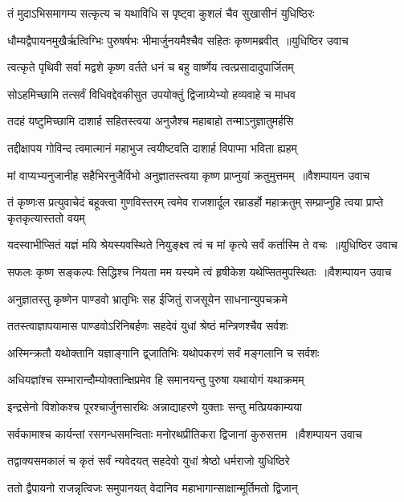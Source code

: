 \twolineshloka
{तं मुदाऽभिसमागम्य सत्कृत्य च यथाविधि}
{स पृष्ट्वा कुशलं चैव सुखासीनं युधिष्ठिरः}


\twolineshloka
{धौम्यद्वैपायनमुखैर्ऋत्विग्भिः पुरुषर्षभः}
{भीमार्जुनयमैश्चैव सहितः कृष्णमब्रवीत् ॥युधिष्ठिर उवाच}


\twolineshloka
{त्वत्कृते पृथिवी सर्वा मद्वशे कृष्ण वर्तते}
{धनं च बहु वार्ष्णेय त्वत्प्रसादादुपार्जितम्}


\twolineshloka
{सोऽहमिच्छामि तत्सर्वं विधिवद्देवकीसुत}
{उपयोक्तुं द्विजाग्र्येभ्यो हव्यवाहे च माधव}


\twolineshloka
{तदहं यष्टुमिच्छामि दाशार्ह सहितस्त्वया}
{अनुजैश्च महाबाहो तन्माऽनुज्ञातुमर्हसि}


\twolineshloka
{तद्दीक्षापय गोविन्द त्वमात्मानं महाभुज}
{त्वयीष्टवति दाशार्ह विपाप्मा भविता ह्यहम्}


\threelineshloka
{मां वाप्यभ्यनुजानीह सहैभिरनुजैर्विभो}
{अनुज्ञातस्त्वया कृष्ण प्राप्नुयां क्रतुमुत्तमम् ॥वैशम्पायन उवाच}
{}


\threelineshloka
{तं कृष्णःस प्रत्युवाचेदं बहूक्त्वा गुणविस्तरम्}
{त्वमेव राजशार्दूल रम्राडर्हो महाक्रतुम्}
{सम्प्राप्नुहि त्वया प्राप्ते कृतकृत्यास्ततो वयम्}


\threelineshloka
{यदस्वाभीप्सितं यज्ञं मयि श्रेयस्यवस्थिते}
{नियुङ्क्ष्व त्वं च मां कृत्ये सर्वं कर्तास्मि ते वचः ॥युधिष्ठिर उवाच}
{}


\threelineshloka
{सफलः कृष्ण सङ्कल्पः सिद्धिश्च नियता मम}
{यस्यमे त्वं हृषीकेश यथेप्सितमुपस्थितः ॥वैशम्पायन उवाच}
{}


\twolineshloka
{अनुज्ञातस्तु कृष्णेन पाण्डवो भ्रातृभिः सह}
{ईजितुं राजसूयेन साधनान्युपचक्रमे}


\twolineshloka
{ततस्त्वाज्ञापयामास पाण्डवोऽरिनिबर्हणः}
{सहदेवं युधां श्रेष्ठं मन्त्रिणश्चैव सर्वशः}


\twolineshloka
{अस्मिन्क्रतौ यथोक्तानि यज्ञाङ्गानि द्व्जातिभिः}
{यथोपकरणं सर्वं मङ्गलानि च सर्वशः}


\twolineshloka
{अधियज्ञांश्च सम्भारान्दौम्योक्तान्क्षिप्रमेव हि}
{समानयन्तु पुरुषा यथायोगं यथाक्रमम्}


\twolineshloka
{इन्द्रसेनो विशोकश्च पूरश्चार्जुनसारथिः}
{अन्नाद्याहरणे युक्ताः सन्तु मत्प्रियकाम्यया}


\twolineshloka
{सर्वकामाश्च कार्यन्तां रसगन्धसमन्विताः}
{मनोरथप्रीतिकरा द्विजानां कुरुसत्तम ॥वैशम्पायन उवाच}


\twolineshloka
{तद्वाक्यसमकालं च कृतं सर्वं न्यवेदयत्}
{सहदेवो युधां श्रेष्ठो धर्मराजो युधिष्ठिरे}


\twolineshloka
{ततो द्वैपायनो राजन्नृत्विजः समुपानयत्}
{वेदानिव महाभागान्साक्षान्मूर्तिमतो द्विजान्}


